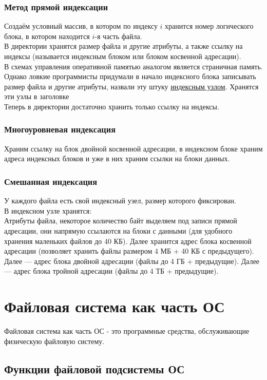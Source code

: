 \documentclass[12pt, a4paper]{article}
\begin{document}
    \subsubsection{Метод прямой индексации}
    Создаём условный массив, в котором по индексу $i$ хранится номер логического блока, в котором находится $i$-я часть файла.\\
    В директории хранятся размер файла и другие атрибуты, а также ссылку на индексы (называется индексным блоком или блоком косвенной адресации).\\
    В схемах управления оперативной памятью аналогом  является страничная память.\\
    Однако ловкие программисты придумали в начало индексного блока записывать размер файла и другие атрибуты, назвали эту штуку \underline{индексным узлом}. Хранятся эти узлы в заголовке\\
    Теперь в директории достаточно хранить только ссылку на индексы.
    \subsubsection{Многоуровневая индексация}
    Храним ссылку на блок двойной косвенной адресации, в индексном блоке храним адреса индексных блоков и уже в них храним ссылки на блоки данных.
    \subsubsection{Смешанная индексация}
    У каждого файла есть свой индексный узел, размер которого фиксирован.\\
    В индексном узле хранятся:\\
    Атрибуты файла, некоторое количество байт выделяем под записи прямой адресации, они напрямую ссылаются на блоки с данными (для удобного хранения маленьких файлов до 40 КБ). Далее хранится адрес блока косвенной адресации (позволяет хранить файлы размером 4 МБ + 40 КБ с предыдущего). Далее --- адрес блока двойной адресации (файлы до 4 ГБ + предыдущие). Далее --- адрес блока тройной адресации (файлы до 4 ТБ + предыдущие).
    \section{Файловая система как часть ОС}
    Файловая система как часть ОС - это программные средства, обслуживающие физическую файловую систему.
    \subsection{Функции файловой подсистемы ОС}
    
\end{document}
